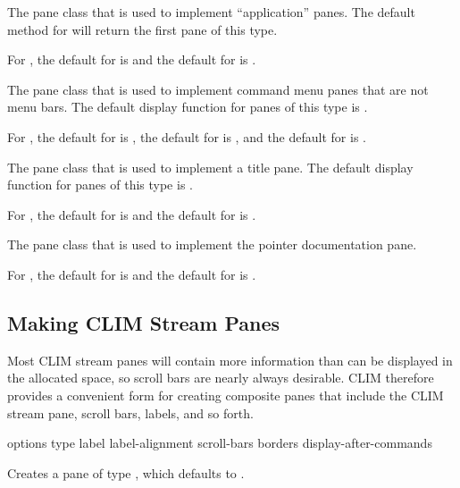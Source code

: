 
The pane class that is used to implement ``application'' panes.  The default
method for  will return the first pane of this type.

For , the default for  is
 and the default for  is .


The pane class that is used to implement command menu panes that are not menu
bars.  The default display function for panes of this type is
.

For , the default for  is
, the default for  is , and
the default for  is .


The pane class that is used to implement a title pane.  The default display
function for panes of this type is .

For , the default for  is  and the
default for  is .


The pane class that is used to implement the pointer documentation pane.

For , the default for  is
 and the default for  is .


\subsection {Making CLIM Stream Panes}

Most CLIM stream panes will contain more information than can be displayed
in the allocated space, so scroll bars are nearly always desirable.  CLIM
therefore provides a convenient form for creating composite panes that include
the CLIM stream pane, scroll bars, labels, and so forth.

 {\rest options 
                                \key type label label-alignment scroll-bars borders
                                     display-after-commands \allow} 

Creates a pane of type , which defaults to .

